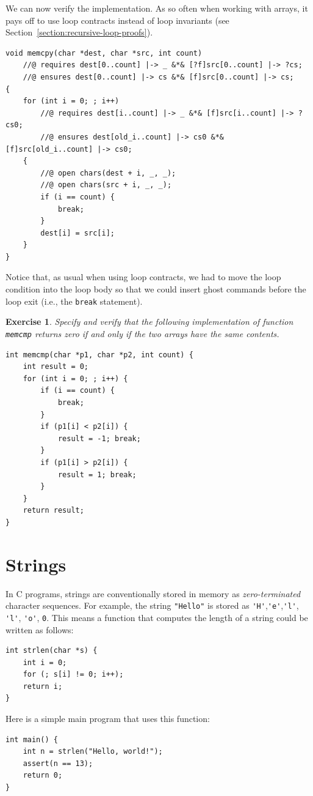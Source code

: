 \documentclass{article}
\newtheorem{exercise}{Exercise}
\begin{document}
We can now verify the implementation. As so often when working
with arrays, it pays off to use loop contracts instead of loop
invariants (see Section~\ref{section:recursive-loop-proofs}).
\begin{lstlisting}
void memcpy(char *dest, char *src, int count)
    //@ requires dest[0..count] |-> _ &*& [?f]src[0..count] |-> ?cs;
    //@ ensures dest[0..count] |-> cs &*& [f]src[0..count] |-> cs;
{
    for (int i = 0; ; i++)
        //@ requires dest[i..count] |-> _ &*& [f]src[i..count] |-> ?cs0;
        //@ ensures dest[old_i..count] |-> cs0 &*& [f]src[old_i..count] |-> cs0;
    {
        //@ open chars(dest + i, _, _);
        //@ open chars(src + i, _, _);
        if (i == count) {
            break;
        }
        dest[i] = src[i];
    }
}
\end{lstlisting}
Notice that, as usual when using loop contracts, we had to move
the loop condition into the loop body so that we could insert
ghost commands before the loop exit (i.e., the
\lstinline|break| statement).

\begin{exercise}\label{exercise:memcmp}
Specify and verify that the following implementation of
function \lstinline|memcmp| returns zero if and only if the two
arrays have the same contents.
\begin{lstlisting}
int memcmp(char *p1, char *p2, int count) {
    int result = 0;
    for (int i = 0; ; i++) {
        if (i == count) {
            break;
        }
        if (p1[i] < p2[i]) {
            result = -1; break;
        }
        if (p1[i] > p2[i]) {
            result = 1; break;
        }
    }
    return result;
}
\end{lstlisting}
\end{exercise}

\section{Strings}\label{section:strings}

In C programs, strings are conventionally stored in memory as
\emph{zero-terminated} character sequences. For example, the
string \lstinline!"Hello"! is stored as
\lstinline!'H'!,\lstinline!'e'!,\lstinline!'l'!,
\lstinline!'l'!, \lstinline!'o'!, \lstinline!0!. This means a
function that computes the length of a string could be written
as follows:
\begin{lstlisting}
int strlen(char *s) {
    int i = 0;
    for (; s[i] != 0; i++);
    return i;
}
\end{lstlisting}
Here is a simple main program that uses this function:
\begin{lstlisting}
int main() {
    int n = strlen("Hello, world!");
    assert(n == 13);
    return 0;
}
\end{lstlisting}
\end{document}
